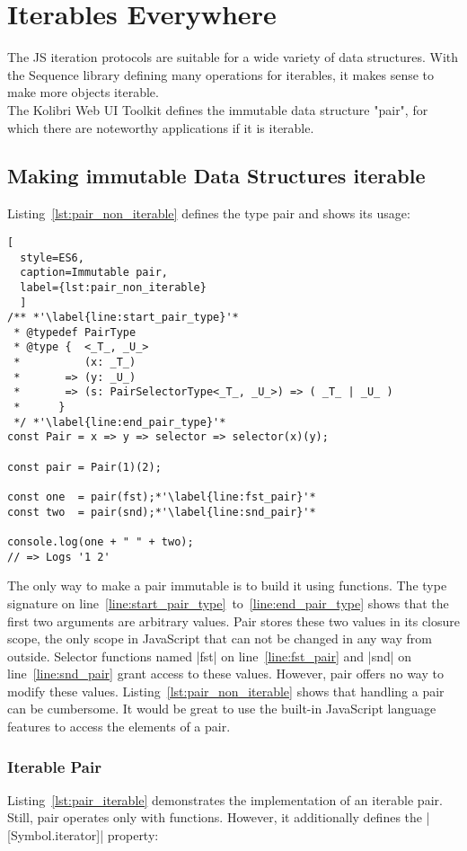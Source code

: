 \section{Iterables Everywhere}
\label{sec:Iterables Everywhere}
The JS iteration protocols are suitable for a wide variety of data structures.
With the Sequence library defining many operations for iterables, it makes
sense to make more objects iterable. \\
The Kolibri Web UI Toolkit defines the immutable data structure "pair", for
which there are noteworthy applications if it is iterable.
\subsection{Making immutable Data Structures iterable}
\label{sub:Making immutable Data Structures iterable}
Listing~\ref{lst:pair_non_iterable} defines the type pair and shows its usage:
\begin{lstlisting}[
  style=ES6, 
  caption=Immutable pair,
  label={lst:pair_non_iterable}
  ]
/** *'\label{line:start_pair_type}'*
 * @typedef PairType
 * @type {  <_T_, _U_>
 *          (x: _T_)
 *       => (y: _U_)
 *       => (s: PairSelectorType<_T_, _U_>) => ( _T_ | _U_ ) 
 *      }
 */ *'\label{line:end_pair_type}'*
const Pair = x => y => selector => selector(x)(y);

const pair = Pair(1)(2);

const one  = pair(fst);*'\label{line:fst_pair}'*
const two  = pair(snd);*'\label{line:snd_pair}'*

console.log(one + " " + two);
// => Logs '1 2'
\end{lstlisting}

The only way to make a pair immutable is to build it using functions. The type 
signature on line~\ref{line:start_pair_type}~to~\ref{line:end_pair_type} shows
that the first two arguments are arbitrary values. Pair stores these two values
in its closure scope, the only scope in JavaScript that can not be changed in
any way from outside.
Selector functions named |fst| on line~\ref{line:fst_pair} and |snd| on 
line~\ref{line:snd_pair} grant access to these values. However, pair offers
no way to modify these values. Listing~\ref{lst:pair_non_iterable} shows that
handling a pair can be cumbersome. It would be great to use the built-in
JavaScript language features to access the elements of a pair.

\subsubsection{Iterable Pair}
\label{subsub:Iterable Pair}
Listing~\ref{lst:pair_iterable} demonstrates the implementation of an iterable
pair. Still, pair operates only with functions. However, it additionally
defines the |[Symbol.iterator]| property:

